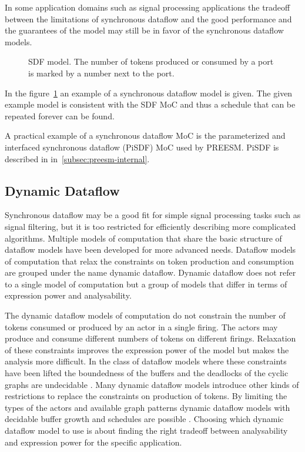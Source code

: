 In some application domains such as signal processing applications the tradeoff between the limitations of synchronous dataflow and the good performance and the guarantees of the model may still be in favor of the synchronous dataflow models.~\cite{lee2015introduction}

\begin{figure}[h!]
    \begin{center}
        
        \caption{SDF model. The number of tokens produced or consumed by a port is marked by a number next to the port.}
        \label{fig:sdf-model}
    \end{center}
\end{figure}

In the figure~\ref{fig:sdf-model} an example of a synchronous dataflow model is given. The given example model is consistent with the SDF MoC and thus a schedule that can be repeated forever can be found.

A practical example of a synchronous dataflow MoC is the parameterized and interfaced synchronous dataflow (PiSDF) MoC used by PREESM. PiSDF is described in in~\ref{subsec:preesm-internal}.

\subsection{Dynamic Dataflow}
\label{subsec:dynamic-dataflow}
Synchronous dataflow may be a good fit for simple signal processing tasks such as signal filtering, but it is too restricted for efficiently describing more complicated algorithms. Multiple models of computation that share the basic structure of dataflow models have been developed for more advanced needs. Dataflow models of computation that relax the constraints on token production and consumption are grouped under the name dynamic dataflow. Dynamic dataflow does not refer to a single model of computation but a group of models that differ in terms of expression power and analysability.~\cite{bhattacharyya2013handbook}

The dynamic dataflow models of computation do not constrain the number of tokens consumed or produced by an actor in a single firing. The actors may produce and consume different numbers of tokens on different firings. Relaxation of these constraints improves the expression power of the model but makes the analysis more difficult. In the class of dataflow models where these constraints have been lifted the boundedness of the buffers and the deadlocks of the cyclic graphs are undecidable \cite{buck1993scheduling}. Many dynamic dataflow models introduce other kinds of restrictions to replace the constraints on production of tokens. By limiting the types of the actors and available graph patterns dynamic dataflow models with decidable buffer growth and schedules are possible \cite{bhattacharyya2013handbook, gao1992well}. Choosing which dynamic dataflow model to use is about finding the right tradeoff between analysability and expression power for the specific application.


